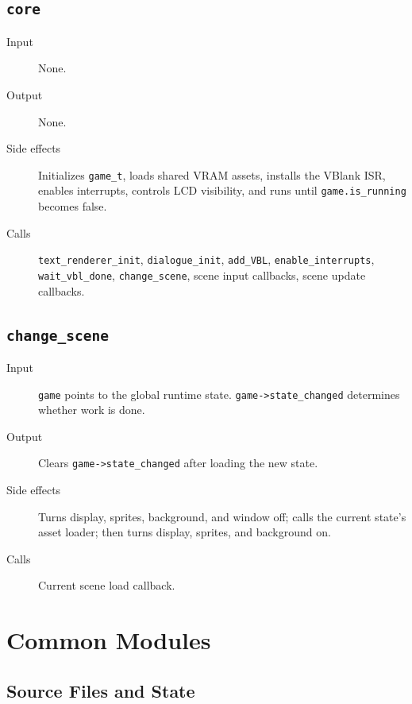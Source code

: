 \subsection*{\texttt{core}}
\begin{description}
  \item[Input] None.
  \item[Output] None.
  \item[Side effects] Initializes \texttt{game\_t}, loads shared VRAM assets, installs the VBlank ISR, enables interrupts, controls LCD visibility, and runs until \texttt{game.is\_running} becomes false.
  \item[Calls] \texttt{text\_renderer\_init}, \texttt{dialogue\_init}, \texttt{add\_VBL}, \texttt{enable\_interrupts}, \texttt{wait\_vbl\_done}, \texttt{change\_scene}, scene input callbacks, scene update callbacks.
\end{description}

\subsection*{\texttt{change\_scene}}
\begin{description}
  \item[Input] \texttt{game} points to the global runtime state. \texttt{game->state\_changed} determines whether work is done.
  \item[Output] Clears \texttt{game->state\_changed} after loading the new state.
  \item[Side effects] Turns display, sprites, background, and window off; calls the current state's asset loader; then turns display, sprites, and background on.
  \item[Calls] Current scene load callback.
\end{description}

\section{Common Modules}

\subsection{Source Files and State}

